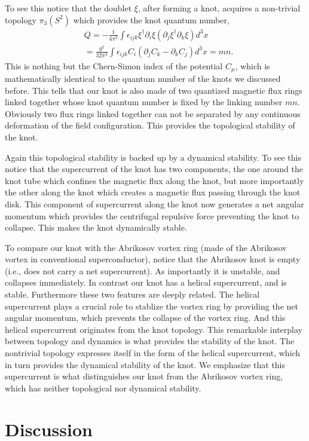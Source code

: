 \documentclass[twocolumn,showpacs,showkeys]{revtex4}
\newcommand{\bea}{\begin{eqnarray}}
\newcommand{\eea}{\end{eqnarray}}
\newcommand{\dfrac}{\displaystyle\frac}
\newcommand{\nn}{\nonumber}
\begin{document}
To see this notice that the doublet $\xi$, after forming a knot,
acquires a non-trivial topology $\pi_3(S^2)$ which provides
the knot quantum number,
\bea
&Q = - \dfrac {1}{4\pi^2} \int \epsilon_{ijk} \xi^{\dagger}
\partial_i \xi ( \partial_j \xi^{\dagger}
\partial_k \xi ) d^3 x \nn\\
&= \dfrac{g^2}{32\pi^2} \int \epsilon_{ijk} C_i
(\partial_j C_k - \partial_k C_j) d^3x
=mn.
\label{bkqn}
\eea
This is nothing but the Chern-Simon index of the potential
$C_\mu$, which is mathematically identical to
the quantum number of the knots we discussed before. 
This tells that our
knot is also made of two quantized magnetic flux rings
linked together whose knot quantum number is fixed by
the linking number $mn$. Obviously two flux rings linked together
can not be separated by any continuous deformation of
the field configuration. This provides the topological stability
of the knot.

Again this topological stability is backed up
by a dynamical stability. To see this notice that the supercurrent
of the knot has two components, the one around
the knot tube which confines the magnetic flux along the knot,
but more importantly the other along the knot
which creates a magnetic flux
passing through the knot disk. This component of supercurrent
along the knot now generates a net
angular momentum which provides
the centrifugal repulsive force preventing the knot to collapse.
This makes the knot dynamically stable.

To compare our knot with the Abrikosov vortex ring (made of the
Abrikosov vortex in conventional superconductor),
notice that the Abrikosov knot is empty (i.e.,
does not carry a net supercurrent).
As importantly it is unstable, and collapses immediately.
In contrast our knot has a helical supercurrent, and is stable. 
Furthermore these two features are deeply related. 
The helical supercurrent plays a crucial role to stablize the vortex
ring by providing the net angular momentum, which prevents the
collapse of the vortex ring. And this helical supercurrent 
originates from the knot topology. This remarkable
interplay between topology and dynamics is what provides
the stability of the knot. The nontrivial topology expresses 
itself in the form of the helical supercurrent, which in turn
provides the dynamical stability of the knot. We emphasize that
this supercurrent is what distinguishes our knot from
the Abrikosov vortex ring, which has neither topological
nor dynamical stability.

\section{Discussion}
\end{document}
